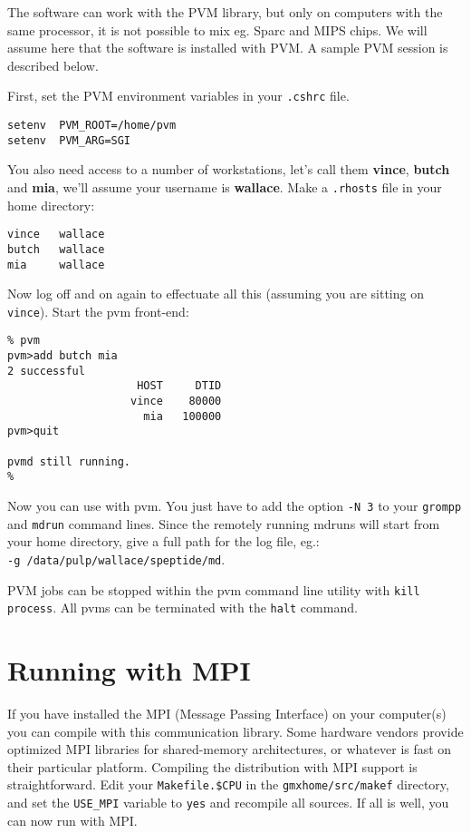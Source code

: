 The {\gromacs} software can work with the PVM library, but only
on computers with the same processor, it is not possible to mix
eg. Sparc and MIPS chips. We will assume
here that the software is installed with PVM. A sample PVM session
is described below.

First, set the PVM environment variables in your {\tt .cshrc} file.
\begin{verbatim}
setenv	PVM_ROOT=/home/pvm
setenv	PVM_ARG=SGI
\end{verbatim}
You also need access to a number of workstations, let's call them
{\bf vince}, {\bf butch} and {\bf mia}, we'll assume your username
is {\bf wallace}. Make a {\tt .rhosts} file in your home directory:
\begin{verbatim}
vince   wallace
butch   wallace
mia     wallace
\end{verbatim}
Now log off and on again to effectuate all this (assuming you are sitting on 
{\tt vince}). Start the pvm front-end: 
\begin{verbatim}
% pvm
pvm>add butch mia
2 successful
                    HOST     DTID
                   vince    80000
                     mia   100000
pvm>quit

pvmd still running.
%
\end{verbatim}
Now you can use {\gromacs} with pvm. You just have to add the option
{\tt -N 3} to your {\tt grompp} and {\tt mdrun} command lines. Since the
remotely running mdruns will start from your home directory, give a full 
path for the log file, eg.:\\
{\tt -g /data/pulp/wallace/speptide/md}.

PVM jobs can be stopped within the pvm command line utility with
{\tt kill process}. All pvms can be terminated with the {\tt halt} command.

\section{Running with MPI}
If you have installed the MPI (Message Passing Interface) on your computer(s)
you can compile {\gromacs} with this communication library. Some
hardware vendors provide optimized MPI libraries for shared-memory
architectures, or whatever is fast on their particular platform.
Compiling the {\gromacs} distribution with MPI support is straightforward.
Edit your {\tt Makefile.\$CPU} in the {\tt gmxhome/src/makef} directory,
and set the {\tt USE\_MPI} variable to {\tt yes} and recompile all sources.
If all is well, you can now run with MPI. 

